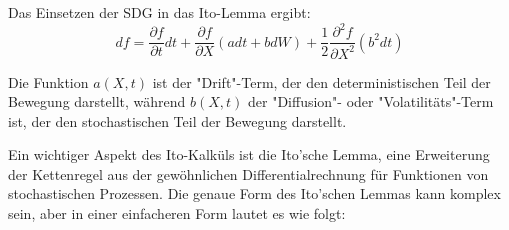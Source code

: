 Das Einsetzen der SDG in das Ito-Lemma ergibt:
\begin{equation}
	df = \frac{\partial f}{\partial t} dt + \frac{\partial f}{\partial X} (a dt + b dW) + \frac{1}{2} \frac{\partial^2 f}{\partial X^2} (b^2 dt)
\end{equation}

Die Funktion $ a(X,t) $ ist der "Drift"-Term, der den deterministischen Teil der Bewegung darstellt, während $ b(X,t) $ der "Diffusion"- oder "Volatilitäts"-Term ist, der den stochastischen Teil der Bewegung darstellt.

Ein wichtiger Aspekt des Ito-Kalküls ist die Ito'sche Lemma, eine Erweiterung der Kettenregel aus der gewöhnlichen Differentialrechnung für Funktionen von stochastischen Prozessen. Die genaue Form des Ito'schen Lemmas kann komplex sein, aber in einer einfacheren Form lautet es wie folgt:



